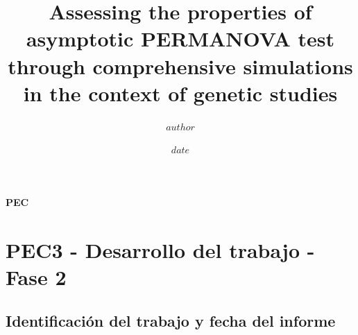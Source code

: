 \documentclass[IB,BIB]{TFUOC}%
\title{Assessing the properties of asymptotic \break PERMANOVA test through comprehensive \break simulations in the context of genetic studies} %
\author{$author$} %
\date{$date$}
\let\oldgls=\gls
\renewcommand{\gls}[1]{{\hypersetup{linkcolor=[RGB]{0,0,0}}
  \oldgls{#1}}}
\begin{document}
\estructura\label{fitxa}

\renewcommand{\bibname}{Referencias}  
\renewcommand{\tablename}{Tabla}
\renewcommand{\figurename}{Figura}
\renewcommand{\listfigurename}{Índice de figuras}
\renewcommand{\listtablename}{Índice de tablas}

\renewcommand*{\glstextformat}{\textbf}

\newpage

\clearpage
{}

\footnotesize %
\tableofcontents
\normalsize

\newpage

\listoffigures


\newpage

\listoftables


\newpage

\listofmyequations


\newpage\null\thispagestyle{empty} %

\Huge
\vfill

\textbf{PEC}
\normalsize

\newpage





\setcounter{chapter}{-1} %
\chapter{PEC3 - Desarrollo del trabajo - Fase 2}
\label{chap:PEC3 - Desarrollo del trabajo - Fase 2}


\section{Identificación del trabajo y fecha del informe}
\label{sec:Identificación del trabajo y fecha del informe}
\end{document}
